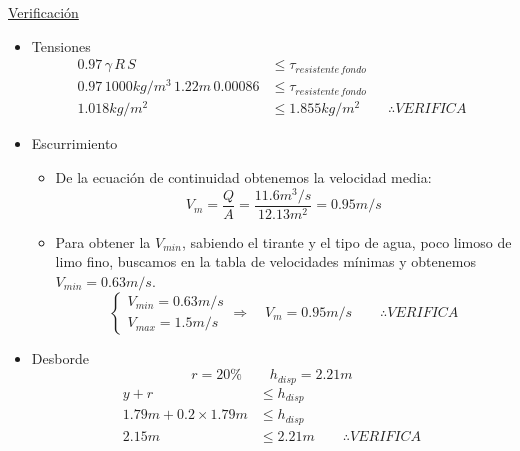 \underline{Verificación}

\begin{itemize}
 \item Tensiones
    \begin{align*}
    0.97 \, \gamma \, R \, S &\leq \tau_{resistente\,fondo} \\
    0.97 \, 1000 kg/m^3 \, 1.22 m \, 0.00086 &\leq \tau_{resistente\,fondo} \\
    1.018 kg/m^2 &\leq 1.855 kg/m^2
    \qquad
    \therefore VERIFICA 
    \end{align*}

 \item Escurrimiento
    \begin{itemize}
    \item De la ecuación de continuidad obtenemos la velocidad media:
	\begin{equation*}
	V_{m} = \dfrac{Q}{A} = \dfrac{11.6 m^3/s}{12.13 m^2} = 0.95 m/s
	\end{equation*}
    \item Para obtener la $V_{min}$, sabiendo el tirante y el tipo de agua, poco limoso de limo fino, buscamos en
    la tabla de velocidades mínimas y obtenemos $V_{min} = 0.63 m/s$.
	\begin{equation*}
	  \begin{cases}
	  V_{min} = 0.63 m/s \\
	  V_{max} = 1.5 m/s
	  \end{cases}
	  \Longrightarrow \quad
	  V_{m} = 0.95 m/s
	  \qquad
	  \therefore VERIFICA
	\end{equation*}
    \end{itemize}

 \item Desborde
    \begin{equation*}
    r = 20\%
    \qquad
    h_{disp} = 2.21 m
    \end{equation*}
    \begin{align*}
    y + r &\leq h_{disp} \\
    1.79 m + 0.2 \times 1.79 m &\leq h_{disp} \\
    2.15 m &\leq 2.21 m
    \qquad
    \therefore VERIFICA
    \end{align*}
\end{itemize}

